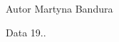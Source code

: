 \begin{DoxyAuthor}{\-Autor}
\-Martyna \-Bandura 
\end{DoxyAuthor}
\begin{DoxyDate}{\-Data}
19.. 
\end{DoxyDate}
